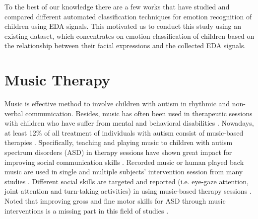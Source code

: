 To the best of our knowledge there are a few works \cite{EmotionResp2013, SlowEcho2009} that have studied and compared different automated 
classification techniques for emotion recognition of children using EDA signals. 
This motivated us to conduct this study using an existing dataset, which concentrates 
on emotion classification of children based on the relationship between their facial 
expressions and the collected EDA signals.

\section{Music Therapy}

Music is effective method to involve children with autism in rhythmic and non-verbal
communication. Besides, music has often been used in therapeutic sessions with children who have suffer from mental and behavioral
disabilities \cite{roper2003melodic, boso2007effect}. Nowadays, at least 12\% of all treatment of individuals with autism consist
of music-based therapies \cite{bhat2013review}. Specifically, teaching and playing music to children
with autism spectrum disorders (ASD) in therapy sessions have shown great impact for improving social communication
skills \cite{lim2011effects}. Recorded music or human played back music are used in single and multiple subjects'
intervention session from many studies \cite{bhat2013review, corbett2008brief}. Different social skills are targeted and reported
(i.e. eye-gaze attention, joint attention and turn-taking activities) in using music-based therapy sessions 
\cite{stephens2008spontaneous, kim2008effects}. Noted that improving gross and fine motor skills for ASD
through music interventions is a missing part in this field of studies \cite{bhat2013review}.


